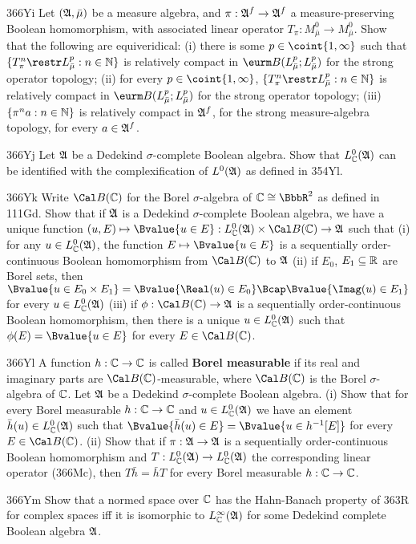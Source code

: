 {\spheader 366Yi Let $(\frak A,\bar\mu)$ be a measure algebra, and
$\pi:\frak A^f\to\frak A^f$ a measure-preserving Boolean homomorphism,
with associated linear operator
$T_{\pi}:M^0_{\bar\mu}\to M^0_{\bar\mu}$.   Show that the following are
equiveridical:  (i) there is some $p\in\coint{1,\infty}$ such that
$\{T_{\pi}^n\restr L^p_{\bar\mu}:n\in\Bbb N\}$ is relatively compact in
$\eurm B(L^p_{\bar\mu};L^p_{\bar\mu})$ for the strong operator topology;
(ii) for every $p\in\coint{1,\infty}$,
$\{T_{\pi}^n\restr L^p_{\bar\mu}:n\in\Bbb N\}$ is relatively compact in
$\eurm B(L^p_{\bar\mu};L^p_{\bar\mu})$ for the strong operator topology;
(iii) $\{\pi^na:n\in\Bbb N\}$ is relatively compact in $\frak A^f$, for
the strong measure-algebra topology, for every $a\in\frak A^f$.

\spheader 366Yj
Let $\frak A$ be a Dedekind $\sigma$-complete Boolean
algebra.   Show that $L^0_{\Bbb C}(\frak A)$ can be identified with the
complexification of $L^0(\frak A)$ as defined in 354Yl.

\spheader 366Yk
Write $\Cal B(\Bbb C)$ for the Borel $\sigma$-algebra of
$\Bbb C\cong\BbbR^2$ as defined in 111Gd.   Show that if $\frak A$ is a
Dedekind $\sigma$-complete Boolean algebra, we have a unique function
$(u,E)\mapsto\Bvalue{u\in E}:
L^0_{\Bbb C}(\frak A)\times\Cal B(\Bbb C)\to\frak A$ such that
(i) for any $u\in L^0_{\Bbb C}(\frak A)$, the function
$E\mapsto\Bvalue{u\in E}$ is a sequentially order-continuous Boolean
homomorphism from $\Cal B(\Bbb C)$ to $\frak A$ (ii) if $E_0$,
$E_1\subseteq\Bbb R$ are Borel sets, then
$\Bvalue{u\in E_0\times E_1}
=\Bvalue{\Real(u)\in E_0}\Bcap\Bvalue{\Imag(u)\in E_1}$ for every
$u\in L^0_{\Bbb C}(\frak A)$ (iii) if $\phi:\Cal B(\Bbb C)\to\frak A$ is a
sequentially order-continuous Boolean homomorphism, then there is a unique
$u\in L^0_{\Bbb C}(\frak A)$ such that $\phi(E)=\Bvalue{u\in E}$ for every
$E\in\Cal B(\Bbb C)$.

\spheader 366Yl
A function $h:\Bbb C\to\Bbb C$ is called {\bf Borel
measurable} if its real and imaginary parts are
$\Cal B(\Bbb C)$-measurable, where
$\Cal B(\Bbb C)$ is the Borel $\sigma$-algebra of $\Bbb C$.
Let $\frak A$ be a Dedekind $\sigma$-complete Boolean algebra.
(i) Show that for every Borel measurable $h:\Bbb C\to\Bbb C$ and
$u\in L^0_{\Bbb C}(\frak A)$ we have an element
$\bar h(u)\in L^0_{\Bbb C}(\frak A)$ such that
$\Bvalue{\bar h(u)\in E}=\Bvalue{u\in h^{-1}[E]}$ for every
$E\in\Cal B(\Bbb C)$.   (ii) Show that if $\pi:\frak A\to\frak A$ is a
sequentially order-continuous Boolean homomorphism and
$T:L^0_{\Bbb C}(\frak A)\to L^0_{\Bbb C}(\frak A)$ the corresponding linear
operator (366Mc), then $T\bar h=\bar hT$ for every Borel measurable
$h:\Bbb C\to\Bbb C$.

\spheader 366Ym
Show that a normed space over $\Bbb C$ has the
Hahn-Banach property of 363R for complex spaces iff it is isomorphic to
$L^{\infty}_{\Bbb C}(\frak A)$ for some Dedekind
complete Boolean algebra $\frak A$.
}%


